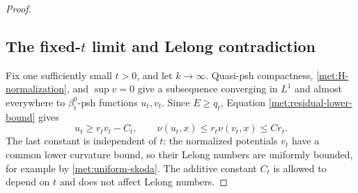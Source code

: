 \documentclass[11pt,letterpaper]{article}
\theoremstyle{definition}
\theoremstyle{remark}
\begin{document}
\begin{proof}
\subsection*{The fixed-\texorpdfstring{$t$}{t} limit and Lelong contradiction}

Fix one sufficiently small \(t>0\), and let \(k\to\infty\).
Quasi-psh compactness, \eqref{met:H-normalization}, and \(\sup v=0\)
give a subsequence converging in \(L^1\) and almost everywhere to
\(\beta_t^0\)-psh functions \(u_t,v_t\).  Since \(E\geq q_t\),
Equation \eqref{met:residual-lower-bound} gives
\begin{equation}
 \label{met:limit-lelong-upper}
 u_t\geq r_tv_t-C_t,
 \qquad \nu(u_t,x)\leq r_t\nu(v_t,x)\leq C r_t.
\end{equation}
The last constant is independent of \(t\): the normalized potentials
\(v_t\) have a common lower curvature bound, so their Lelong numbers
are uniformly bounded, for example by \eqref{met:uniform-skoda}.
The additive constant \(C_t\) is allowed to depend on \(t\) and
does not affect Lelong numbers.


\end{proof}
\end{document}
